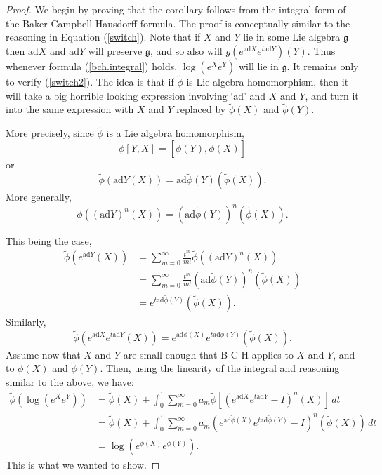 \documentclass[12pt]{amsbook}
\let \frak = \mathfrak
\theoremstyle{plain}
\numberwithin{equation}{chapter}
\numberwithin{theorem}{chapter}
\begin{document}
\begin{proof}
We begin by proving that the corollary follows from the integral form of the
Baker-Campbell-Hausdorff formula. The proof is conceptually similar to the
reasoning in Equation (\ref{switch}). Note that if $X$ and $Y$ lie in some Lie
algebra $\frak{g}$ then $\mathrm{ad}X$ and $\mathrm{ad}Y$ will preserve
$\frak{g}$, and so also will $g(e^{\mathrm{ad}X}e^{t\mathrm{ad}Y})(Y)$. Thus
whenever formula (\ref{bch.integral}) holds, $\log\left(  e^{X}e^{Y}\right)  $
will lie in $\frak{g}$. It remains only to verify (\ref{switch2}). The idea is
that if $\widetilde{\phi}$ is Lie algebra homomorphism, then it will take a
big horrible looking expression involving `ad' and $X$ and $Y$, and turn it
into the same expression with $X$ and $Y$ replaced by $\widetilde{\phi}\left(
X\right)  $ and $\widetilde{\phi}\left(  Y\right)  $.

More precisely, since $\widetilde{\phi}$ is a Lie algebra homomorphism,
\[
\widetilde{\phi}[Y,X]=[\widetilde{\phi}(Y),\widetilde{\phi}(X)]
\]
or
\[
\widetilde{\phi}\left(  \mathrm{ad}Y\left(  X\right)  \right)  =\mathrm{ad}%
\widetilde{\phi}\left(  Y\right)  \left(  \widetilde{\phi}\left(  X\right)
\right)  \text{.}%
\]
More generally,
\[
\widetilde{\phi}\left(  \left(  \mathrm{ad}Y\right)  ^{n}\left(  X\right)
\right)  =\left(  \mathrm{ad}\widetilde{\phi}\left(  Y\right)  \right)
^{n}\left(  \widetilde{\phi}\left(  X\right)  \right)  \text{.}%
\]

This being the case,
\begin{align*}
\widetilde{\phi}\left(  e^{\mathrm{ad}Y}\left(  X\right)  \right)    &
=\sum_{m=0}^{\infty}\frac{t^{m}}{m!}\widetilde{\phi}\left(  \left(
\mathrm{ad}Y\right)  ^{n}\left(  X\right)  \right)  \\
& =\sum_{m=0}^{\infty}\frac{t^{m}}{m!}\left(  \mathrm{ad}\widetilde{\phi
}\left(  Y\right)  \right)  ^{n}\left(  \widetilde{\phi}\left(  X\right)
\right)  \\
& =e^{t\mathrm{ad}\widetilde{\phi}(Y)}\left(  \widetilde{\phi}(X)\right)
\text{.}%
\end{align*}
Similarly,
\[
\widetilde{\phi}\left(  e^{\mathrm{ad}X}e^{t\mathrm{ad}Y}(X)\right)
=e^{\mathrm{ad}\widetilde{\phi}(X)}e^{t\mathrm{ad}\widetilde{\phi}(Y)}\left(
\widetilde{\phi}(X)\right)  \text{.}%
\]
Assume now that $X$ and $Y$ are small enough that B-C-H applies to $X$ and
$Y$, and to $\widetilde{\phi}(X)$ and $\widetilde{\phi}(Y)$. Then, using the
linearity of the integral and reasoning similar to the above, we have:
\begin{align*}
\widetilde{\phi}\left(  \log\left(  e^{X}e^{Y}\right)  \right)    &
=\widetilde{\phi}(X)+\int_{0}^{1}\sum_{m=0}^{\infty}a_{m}\widetilde{\phi
}\left[  \left(  e^{\mathrm{ad}X}e^{t\mathrm{ad}Y}-I\right)  ^{n}(X)\right]
\,dt\\
& =\widetilde{\phi}(X)+\int_{0}^{1}\sum_{m=0}^{\infty}a_{m}\left(
e^{\mathrm{ad}\widetilde{\phi}(X)}e^{t\mathrm{ad}\widetilde{\phi}%
(Y)}-I\right)  ^{n}(\widetilde{\phi}(X))\,dt\\
& =\log\left(  e^{\widetilde{\phi}(X)}e^{\widetilde{\phi}(Y)}\right)  \text{.}%
\end{align*}
This is what we wanted to show.
\end{proof}
\end{document}
